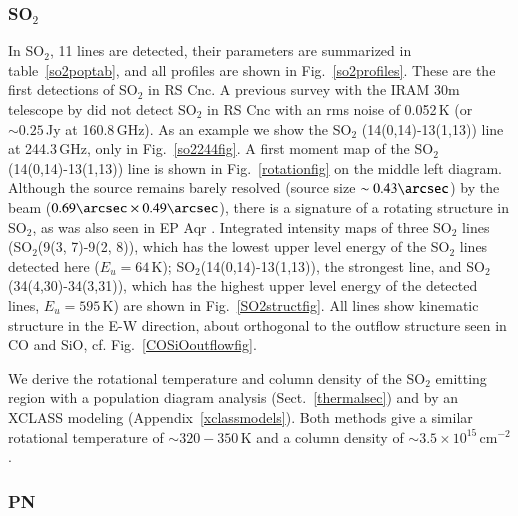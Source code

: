 \documentclass{aa}
\begin{document}
\subsubsection{SO$_2$}\label{so2sec}

In SO$_2$, 11 lines are detected, their parameters are summarized in
table~\ref{so2poptab}, and all profiles are shown in
Fig.~\ref{so2profiles}. These are the first detections of SO$_2$ in RS
Cnc. A previous survey with the IRAM 30m telescope by \cite{olmg93}
did not detect SO$_2$ in RS Cnc with an rms noise of 0.052\,K (or
$\sim 0.25$\,Jy at 160.8\,GHz).  As an example we show the SO$_2$
(14(0,14)-13(1,13)) line at 244.3\,GHz, only in
Fig.~\ref{so2244fig}. A first moment map of the SO$_2$
(14(0,14)-13(1,13)) line is  shown in Fig.~\ref{rotationfig} on the
middle left diagram. Although the source remains barely resolved
(source size $\sim 0.43\arcsec$) by the beam
($0.69\arcsec\times0.49\arcsec$), there is a signature of a rotating
structure in SO$_2$, as was also seen in EP Aqr
\citep{hrddk2018,thnetal2019}.  Integrated intensity maps of three
SO$_2$ lines  (SO$_2$(9(3, 7)-9(2, 8)), which has the lowest upper
level energy of the SO$_2$ lines detected here ($E_u = 64$\,K);
SO$_2$(14(0,14)-13(1,13)), the strongest line, and
SO$_2$(34(4,30)-34(3,31)), which has the highest upper level energy of
the detected lines, $E_u = 595$\,K) are shown in
Fig.~\ref{SO2structfig}. All lines show kinematic structure in the E-W
direction, about orthogonal to the   outflow structure seen in CO and
SiO,  cf. Fig.~\ref{COSiOoutflowfig}.

We derive the rotational temperature and column density of the SO$_2$
emitting region with a population diagram analysis
(Sect.~\ref{thermalsec}) and by an XCLASS modeling
(Appendix~\ref{xclassmodels}).  Both methods give a similar rotational
temperature of $\sim 320-350$\,K and a column density of $\sim
3.5\times10^{15}$\,cm$^{-2}$.

\subsubsection{PN}\label{pnsec}
\end{document}
